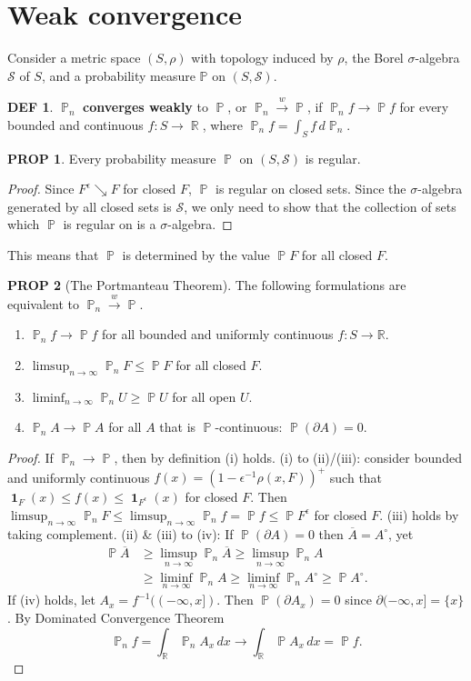 \documentclass[hidelinks,11pt]{article}
\theoremstyle{definition}
\newtheorem*{defin}{DEF}
\theoremstyle{dotless}
\newtheorem{prop}{PROP}[section]
\theoremstyle{remark}
\DeclareMathOperator{\R}{\mathbb{R}}
\DeclareMathOperator{\1}{\mathbf{1}}
\DeclareMathOperator{\p}{\mathbb{P}}
\begin{document}
\tableofcontents

\section{Weak convergence}
Consider a metric space $(S,\rho)$ with topology induced by $\rho$, the Borel $\sigma$-algebra $\mathcal{S}$ of $S$, and a probability measure $\mathbb{P}$ on $(S,\mathcal{S})$.
\begin{defin}
$\p_n$ \textbf{converges weakly} to $\p$, or $\p_n\xrightarrow{w}\p$, if $\p_nf\to\p f$ for every bounded and continuous $f:S\to\R$, where $\p_nf=\int_Sf\,d\p_n$.
\end{defin}
\begin{prop}\label{Prop 1.1}
Every probability measure $\p$ on $(S,\mathcal{S})$ is regular.
\end{prop}
\begin{proof}
Since $F^\epsilon\searrow F$ for closed $F$, $\p$ is regular on closed sets. Since the $\sigma$-algebra generated by all closed sets is $\mathcal{S}$, we only need to show that the collection of sets which $\p$ is regular on is a $\sigma$-algebra.
\end{proof}
This means that $\p$ is determined by the value $\p F$ for all closed $F$.
\begin{prop}[The Portmanteau Theorem]\label{Portmanteau Theorem}The following formulations are equivalent to $\p_n\xrightarrow{w}\p$.
\begin{enumerate}[label=\textup{(\roman*)}]
    \item $\p_nf\to\p f$ for all bounded and uniformly continuous $f:S\to\mathbb{R}$.
    \item $\limsup_{n\to\infty}\p_nF\leq\p F$ for all closed $F$.
    \item $\liminf_{n\to\infty}\p_nU\geq\p U$ for all open $U$.
    \item $\p_nA\to\p A$ for all $A$ that is $\p$-continuous: $\p(\partial A)=0$.
\end{enumerate}
\end{prop}
\begin{proof}
If $\p_n\to\p$, then by definition (i) holds.\smallbreak
(i) to (ii)/(iii): consider  bounded and uniformly continuous $f(x)=(1-\epsilon^{-1}\rho( x,F))^+$ such that $\1_F(x)\leq f(x)\leq\1_{F^\epsilon}(x)$ for closed $F$. Then $\limsup_{n\to\infty}\p_nF\leq\limsup_{n\to\infty}\p_nf=\p f\leq\p F^\epsilon$ for closed $F$. (iii) holds by taking complement.\smallbreak
(ii) \& (iii) to (iv): If $\p(\partial A)=0$ then $\overline{A}=A^\circ$, yet
\begin{align*}
\p\overline{A}&\geq\limsup_{n\to\infty}\p_n\overline{A}\geq\limsup_{n\to\infty}\p_nA\\
&\geq\liminf_{n\to\infty}\p_nA\geq\liminf_{n\to\infty}\p_nA^\circ\geq\p A^\circ.
\end{align*}
If (iv) holds, let $A_x=f^{-1}((-\infty,x])$. Then $\p(\partial A_x)=0$ since $\partial(-\infty,x]=\{x\}$. By Dominated Convergence Theorem
\[\p_nf=\int_{\R}\p_nA_x\,dx\to\int_{\R}\p A_x\,dx=\p f.\]
\end{proof}
\end{document}
